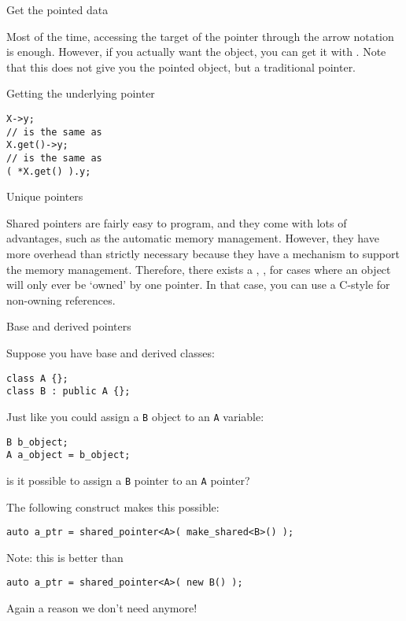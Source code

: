  {Get the pointed data}

Most of the time, accessing the target of the pointer through the
arrow notation is enough. However, if you actually want the object,
you can get it with . Note that this does not give
you the pointed object, but a traditional pointer.

\begin{block}{Getting the underlying pointer}
  \label{sl:pointer-get}
\begin{lstlisting}
X->y;
// is the same as
X.get()->y;
// is the same as
( *X.get() ).y;
\end{lstlisting}

\end{block}

 {Unique pointers}

Shared pointers are fairly easy to program, and they come with lots of
advantages, such as the automatic memory management. However, they
have more overhead than strictly necessary because they have a
 mechanism to support the memory
management. Therefore, there exists a ,
, for cases where an object will only ever be
`owned' by one pointer. In that case, you can use a C-style
 for non-owning references.

 {Base and derived pointers}

Suppose you have base and derived classes:
\begin{lstlisting}
class A {};
class B : public A {};  
\end{lstlisting}
Just like you could assign a \lstinline{B} object to an \lstinline{A}
variable:
\begin{lstlisting}
B b_object;
A a_object = b_object;
\end{lstlisting}
is it possible to assign a \lstinline{B} pointer to an \lstinline{A}
pointer?

The following construct makes this possible:
\begin{lstlisting}
auto a_ptr = shared_pointer<A>( make_shared<B>() );
\end{lstlisting}

Note: this is better than
\begin{lstlisting}
auto a_ptr = shared_pointer<A>( new B() );
\end{lstlisting}
Again a reason we don't need  anymore!

